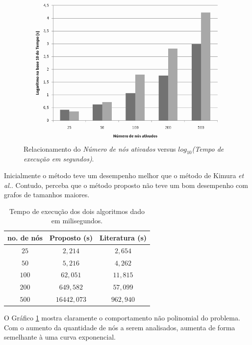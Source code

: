\documentclass{acm_proc_article-sp}
\begin{document}
\begin{figure}[ht]%
\centering
\includegraphics[scale=.35]{img/nosXtempo.png}
\caption{Relacionamento do \textit{Número de nós ativados} versus \textit{$log_{10}$(Tempo de execução em
segundos)}.}
\label{runtime}
\end{figure}

Inicialmente o método teve um desempenho melhor que o método de Kimura \textit{et al.}. Contudo, perceba que o
método proposto não teve um bom desempenho com grafos de tamanhos maiores. 

\begin{table}[!h] \label{tabtempo}
\centering
\begin{tabular}{|c|c|c|}
\hline 
\hline \textbf{no. de nós}  & \textbf{Proposto (s)} & \textbf{Literatura (s)}\\
\hline 
\hline \textbf{$25$}   & $2,214$  & $2,654$\\
\hline \textbf{$50$}   & $5,216$  & $4,262$\\
\hline \textbf{$100$}  & $62,051$ & $11,815$\\
\hline \textbf{$200$}  & $649,582$ & $57,099$\\
\hline \textbf{$500$}  & $16442,073$ & $962,940$\\
\hline \hline
\end{tabular}
\caption{Tempo de execução dos dois algoritmos dado em milisegundos.}
\end{table}

O Gráfico \ref{runtime} mostra claramente o comportamento não polinomial do problema. Com o aumento da quantidade
de nós a serem analisados, aumenta de forma semelhante à uma curva exponencial. 
\end{document}
